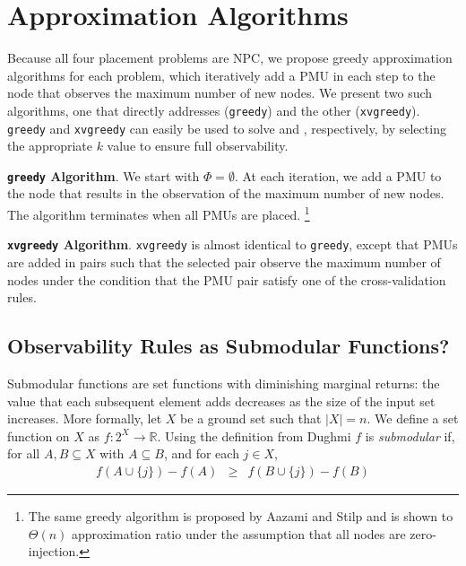 \section{Approximation Algorithms}
\label{sec:approx}

Because all four placement problems are NPC, we propose greedy approximation algorithms for each problem, which iteratively add 
a PMU in each step to the node that observes the maximum number of new nodes. We present two such algorithms, one that directly addresses \maxinc ({\tt greedy}) and the other 
\xvalpart ({\tt xvgreedy}). {\tt greedy} and {\tt xvgreedy} can easily be used to solve \full and \xvals, respectively, by selecting the appropriate $k$ value to ensure full observability.

{\bf {\tt greedy} Algorithm}. We start with $\Phi = \emptyset$.  At each iteration, we add a PMU to the node that results in the observation of the maximum number of 
new nodes. The algorithm terminates when all PMUs are placed.  {\footnote {\small The same greedy algorithm is proposed by Aazami and Stilp \cite{Aazami07} and
is shown to  $\Theta(n)$ approximation ratio under the assumption that all nodes are zero-injection.}}


{\bf {\tt xvgreedy} Algorithm}. {\tt xvgreedy} is almost identical to {\tt greedy}, except that PMUs are added in pairs such that the selected pair observe
the maximum number of nodes under the condition that the PMU pair satisfy one of the cross-validation rules. %





\subsection{Observability Rules as Submodular Functions?}

Submodular functions are set functions with diminishing marginal returns: the value that each subsequent element adds decreases
as the size of the input set increases. More formally, let $X$ be a ground set such that $|X|=n$. We define a set function on $X$ as $f: 2^X \rightarrow \mathbb{R}$.
Using the definition from Dughmi \cite{Dughmi09} %
$f$ is \emph{submodular} if, for all $A,B \subseteq X$ with $A \subseteq B$, and for each $j \in X$,
\begin{eqnarray}
f(A \cup \{j\}) - f(A) &\geq& f(B \cup \{j\}) - f(B)
\end{eqnarray}


